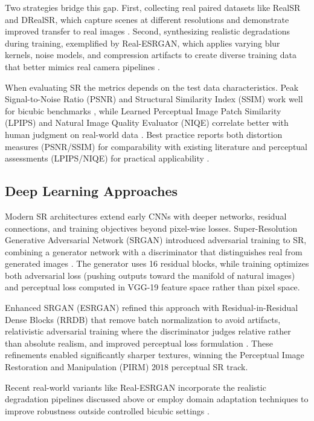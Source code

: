 Two strategies bridge this gap. First, collecting real paired datasets like RealSR and DRealSR, which capture scenes at different resolutions and demonstrate improved transfer to real images \cite{Cai2019RealSR,Wei2020DRealSR}. Second, synthesizing realistic degradations during training, exemplified by Real-ESRGAN, which applies varying blur kernels, noise models, and compression artifacts to create diverse training data that better mimics real camera pipelines \cite{Wang2021RealESRGAN}.

When evaluating SR the metrics depends  on the test data characteristics. Peak Signal-to-Noise Ratio (PSNR) and Structural Similarity Index (SSIM) work well for bicubic benchmarks \cite{Wang2004SSIM}, while Learned Perceptual Image Patch Similarity (LPIPS) and Natural Image Quality Evaluator (NIQE) correlate better with human judgment on real-world data \cite{Zhang2018LPIPS}. Best practice reports both distortion measures (PSNR/SSIM) for comparability with existing literature and perceptual assessments (LPIPS/NIQE) for practical applicability \cite{Lugmayr2020NTIRE}.

\subsection{Deep Learning Approaches}

Modern SR architectures extend early CNNs with deeper networks, residual connections, and training objectives beyond pixel-wise losses. Super-Resolution Generative Adversarial Network (SRGAN) introduced adversarial training to SR, combining a generator network with a discriminator that distinguishes real from generated images \cite{Ledig2017SRGAN}. The generator uses 16 residual blocks, while training optimizes both adversarial loss (pushing outputs toward the manifold of natural images) and perceptual loss computed in VGG-19 feature space rather than pixel space.

Enhanced SRGAN (ESRGAN) refined this approach with Residual-in-Residual Dense Blocks (RRDB) that remove batch normalization to avoid artifacts, relativistic adversarial training where the discriminator judges relative rather than absolute realism, and improved perceptual loss formulation \cite{Wang2018ESRGAN}. These refinements enabled significantly sharper textures, winning the Perceptual Image Restoration and Manipulation (PIRM) 2018 perceptual SR track.

Recent real-world variants like Real-ESRGAN incorporate the realistic degradation pipelines discussed above or employ domain adaptation techniques to improve robustness outside controlled bicubic settings \cite{Wang2021RealESRGAN,Cai2019RealSR}.

